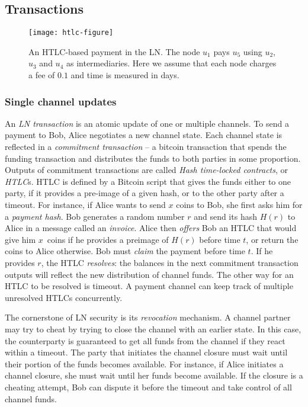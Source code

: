 \subsection{Transactions}

\begin{figure*}[tb]
	\texttt{[image: htlc-figure]}
	\caption{An HTLC-based payment in the LN. The node $u_1$ pays $u_5$ using $u_2$, $u_3$ and $u_4$ as intermediaries. 
		Here we assume that each node charges a fee of $0.1$ and time is measured in days.\label{fig:htlc}}
\end{figure*}

\subsubsection*{Single channel updates}

An \textit{LN transaction} is an atomic update of one or multiple channels.
To send a payment to Bob, Alice negotiates a new channel state.
Each channel state is reflected in a \textit{commitment transaction} -- a bitcoin transaction that spends the funding transaction and distributes the funds to both parties in some proportion.
Outputs of commitment transactions are called \textit{Hash time-locked contracts}, or \textit{HTLC}s.
HTLC is defined by a Bitcoin script that gives the funds either to one party, if it provides a pre-image of a given hash, or to the other party after a timeout.
For instance, if Alice wants to send $x$ coins to Bob, she first asks him for a \textit{payment hash}.
Bob generates a random number $r$ and send its hash $H(r)$ to Alice in a message called an \textit{invoice}.
Alice then \textit{offers} Bob an HTLC that would give him $x$~coins if he provides a preimage of $H(r)$ before time $t$, or return the coins to Alice otherwise.
Bob must \textit{claim} the payment before time $t$.
If he provides $r$, the HTLC \textit{resolves}: the balances in the next commitment transaction outputs will reflect the new distribution of channel funds.
The other way for an HTLC to be resolved is timeout.
A payment channel can keep track of multiple unresolved HTLCs concurrently.

The cornerstone of LN security is its \textit{revocation} mechanism.
A channel partner may try to cheat by trying to close the channel with an earlier state.
In this case, the counterparty is guaranteed to get all funds from the channel if they react within a timeout.
The party that initiates the channel closure must wait until their portion of the funds becomes available.
For instance, if Alice initiates a channel closure, she must wait until her funds become available.
If the closure is a cheating attempt, Bob can dispute it before the timeout and take control of all channel funds.


